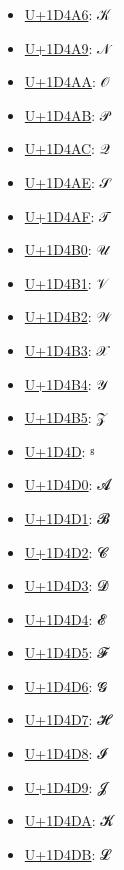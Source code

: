 \begin{itemize}
	\item \href{https://decodeunicode.org/en/u+1D4A6}{U+1D4A6}: 𝒦
	\item \href{https://decodeunicode.org/en/u+1D4A9}{U+1D4A9}: 𝒩
	\item \href{https://decodeunicode.org/en/u+1D4AA}{U+1D4AA}: 𝒪
	\item \href{https://decodeunicode.org/en/u+1D4AB}{U+1D4AB}: 𝒫
	\item \href{https://decodeunicode.org/en/u+1D4AC}{U+1D4AC}: 𝒬
	\item \href{https://decodeunicode.org/en/u+1D4AE}{U+1D4AE}: 𝒮
	\item \href{https://decodeunicode.org/en/u+1D4AF}{U+1D4AF}: 𝒯
	\item \href{https://decodeunicode.org/en/u+1D4B0}{U+1D4B0}: 𝒰
	\item \href{https://decodeunicode.org/en/u+1D4B1}{U+1D4B1}: 𝒱
	\item \href{https://decodeunicode.org/en/u+1D4B2}{U+1D4B2}: 𝒲
	\item \href{https://decodeunicode.org/en/u+1D4B3}{U+1D4B3}: 𝒳
	\item \href{https://decodeunicode.org/en/u+1D4B4}{U+1D4B4}: 𝒴
	\item \href{https://decodeunicode.org/en/u+1D4B5}{U+1D4B5}: 𝒵
	\item \href{https://decodeunicode.org/en/u+1D4D}{U+1D4D}: ᵍ
	\item \href{https://decodeunicode.org/en/u+1D4D0}{U+1D4D0}: 𝓐
	\item \href{https://decodeunicode.org/en/u+1D4D1}{U+1D4D1}: 𝓑
	\item \href{https://decodeunicode.org/en/u+1D4D2}{U+1D4D2}: 𝓒
	\item \href{https://decodeunicode.org/en/u+1D4D3}{U+1D4D3}: 𝓓
	\item \href{https://decodeunicode.org/en/u+1D4D4}{U+1D4D4}: 𝓔
	\item \href{https://decodeunicode.org/en/u+1D4D5}{U+1D4D5}: 𝓕
	\item \href{https://decodeunicode.org/en/u+1D4D6}{U+1D4D6}: 𝓖
	\item \href{https://decodeunicode.org/en/u+1D4D7}{U+1D4D7}: 𝓗
	\item \href{https://decodeunicode.org/en/u+1D4D8}{U+1D4D8}: 𝓘
	\item \href{https://decodeunicode.org/en/u+1D4D9}{U+1D4D9}: 𝓙
	\item \href{https://decodeunicode.org/en/u+1D4DA}{U+1D4DA}: 𝓚
	\item \href{https://decodeunicode.org/en/u+1D4DB}{U+1D4DB}: 𝓛

\end{itemize}
